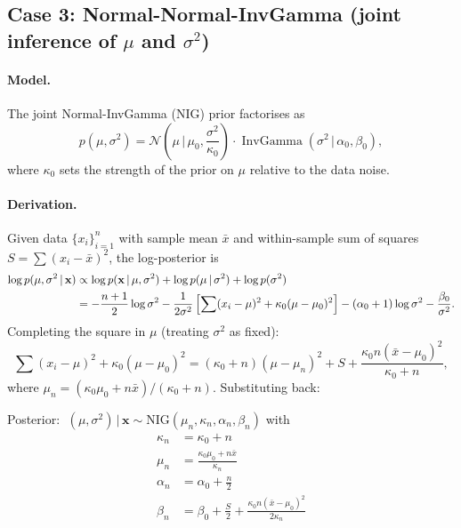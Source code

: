 \documentclass[11pt, a4paper]{article}
\newcommand{\N}{\mathcal{N}}
\newcommand{\IG}{\operatorname{InvGamma}}
\theoremstyle{definition}
\begin{document}
\subsection{Case 3: Normal-Normal-InvGamma (joint inference of $\mu$ and $\sigma^2$)}
\label{sec:nig_joint}

\paragraph{Model.}
The joint Normal-InvGamma (NIG) prior factorises as
\begin{equation}
  p(\mu,\sigma^2) = \N\!\left(\mu\,\Big|\,\mu_0,\frac{\sigma^2}{\kappa_0}\right)
  \cdot\IG(\sigma^2\,|\,\alpha_0,\beta_0),
  \label{eq:nig_joint_prior}
\end{equation}
where $\kappa_0$ sets the strength of the prior on $\mu$ relative to the data noise.

\paragraph{Derivation.}
Given data $\{x_i\}_{i=1}^n$ with sample mean $\bar{x}$ and
within-sample sum of squares $S=\sum(x_i-\bar{x})^2$, the log-posterior is
\begin{align}
  \log p(\mu,\sigma^2\,|\,\mathbf{x})
  &\propto \log p(\mathbf{x}\,|\,\mu,\sigma^2)
           + \log p(\mu\,|\,\sigma^2)
           + \log p(\sigma^2) \notag\\
  &= -\frac{n+1}{2}\log\sigma^2
     -\frac{1}{2\sigma^2}\left[
       \sum(x_i-\mu)^2 + \kappa_0(\mu-\mu_0)^2
     \right]
     - (\alpha_0+1)\log\sigma^2 - \frac{\beta_0}{\sigma^2}.
\end{align}
Completing the square in $\mu$ (treating $\sigma^2$ as fixed):
\[
  \sum(x_i-\mu)^2 + \kappa_0(\mu-\mu_0)^2
  = (\kappa_0+n)\!\left(\mu - \mu_n\right)^2 + S
  + \frac{\kappa_0 n(\bar{x}-\mu_0)^2}{\kappa_0+n},
\]
where $\mu_n = (\kappa_0\mu_0+n\bar{x})/(\kappa_0+n)$.  Substituting back:

\begin{tcolorbox}[colback=green!5, colframe=green!60!black, title=Normal-InvGamma joint update, fontupper=\small]
Posterior: $\;(\mu,\sigma^2)\,|\,\mathbf{x}\sim\mathrm{NIG}(\mu_n,\kappa_n,\alpha_n,\beta_n)$
with
\begin{align}
  \kappa_n &= \kappa_0 + n \label{eq:nig_joint_kappa}\\
  \mu_n    &= \frac{\kappa_0\mu_0 + n\bar{x}}{\kappa_n} \label{eq:nig_joint_mu}\\
  \alpha_n &= \alpha_0 + \frac{n}{2} \label{eq:nig_joint_alpha}\\
  \beta_n  &= \beta_0 + \frac{S}{2}
             + \frac{\kappa_0 n(\bar{x}-\mu_0)^2}{2\kappa_n} \label{eq:nig_joint_beta}
\end{align}
\end{tcolorbox}
\end{document}
